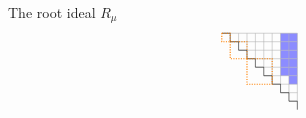 \documentclass[dvipsnames]{beamer}
\theoremstyle{definition}
\newcommand{\qtrootcolor}{blue!45}
\newcounter{c}
\begin{document}
\begin{frame}{The root ideal \(R_\mu\)}
\begin{align*}
\begin{tikzpicture}[scale=.213]
 \draw[draw = none, fill = \qtrootcolor] (8,-1) rectangle (9,-2);
 \draw[draw = none, fill = \qtrootcolor] (8,-2) rectangle (9,-3);
 \draw[draw = none, fill = \qtrootcolor] (8,-3) rectangle (9,-4);
 \draw[draw = none, fill = \qtrootcolor] (8,-4) rectangle (9,-5);
 \draw[draw = none, fill = \qtrootcolor] (8,-5) rectangle (9,-6);
 \draw[draw = none, fill = \qtrootcolor] (9,-1) rectangle (10,-2);
 \draw[draw = none, fill = \qtrootcolor] (9,-2) rectangle (10,-3);
 \draw[draw = none, fill = \qtrootcolor] (9,-3) rectangle (10,-4);
 \draw[draw = none, fill = \qtrootcolor] (9,-4) rectangle (10,-5);
 \draw[draw = none, fill = \qtrootcolor] (9,-5) rectangle (10,-6);
 \draw[draw = none, fill = \qtrootcolor] (9,-6) rectangle (10,-7);
 \draw[thin, black!31] (1,-1) -- (10,-1);
\draw[thin, black!31] (2,-1) -- (2,-1);
\draw[thin, black!31] (2,-2) -- (10,-2);
\draw[thin, black!31] (3,-2) -- (3,-1);
\draw[thin, black!31] (3,-3) -- (10,-3);
\draw[thin, black!31] (4,-3) -- (4,-1);
\draw[thin, black!31] (4,-4) -- (10,-4);
\draw[thin, black!31] (5,-4) -- (5,-1);
\draw[thin, black!31] (5,-5) -- (10,-5);
\draw[thin, black!31] (6,-5) -- (6,-1);
\draw[thin, black!31] (6,-6) -- (10,-6);
\draw[thin, black!31] (7,-6) -- (7,-1);
\draw[thin, black!31] (7,-7) -- (10,-7);
\draw[thin, black!31] (8,-7) -- (8,-1);
\draw[thin, black!31] (8,-8) -- (10,-8);
\draw[thin, black!31] (9,-8) -- (9,-1);
\draw[thin, black!31] (9,-9) -- (10,-9);
\draw[thin, black!31] (10,-9) -- (10,-1);
 \draw[thin] (1,-1) -- (2,-1);
\draw[thin] (2,-1) -- (2,-2);
\draw[thin] (2,-2) -- (3,-2);
\draw[thin] (3,-2) -- (3,-3);
\draw[thin] (3,-3) -- (4,-3);
\draw[thin] (4,-3) -- (4,-4);
\draw[thin] (4,-4) -- (5,-4);
\draw[thin] (5,-4) -- (5,-5);
\draw[thin] (5,-5) -- (6,-5);
\draw[thin] (6,-5) -- (6,-6);
\draw[thin] (6,-6) -- (7,-6);
\draw[thin] (7,-6) -- (7,-7);
\draw[thin] (7,-7) -- (8,-7);
\draw[thin] (8,-7) -- (8,-8);
\draw[thin] (8,-8) -- (9,-8);
\draw[thin] (9,-8) -- (9,-9);
\draw[thin] (9,-9) -- (10,-9);
\draw[thin] (10,-9) -- (10,-10);
\draw[thick, densely dotted, orange] (1,-1) rectangle (2,-2);
\draw[thick, densely dotted, orange] (2,-2) rectangle (4,-4);
\draw[thick, densely dotted, orange] (4,-4) rectangle (7,-7);

\end{tikzpicture}
\end{align*}
\end{frame}
\end{document}
